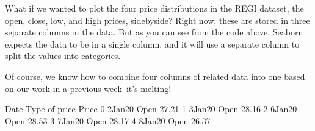 \documentclass[letterpaper,10pt,english]{sphinxmanual}
\begin{document}
\noindent{}

What if we wanted to plot the four price distributions in the REGI dataset, the open, close, low, and high prices, side\sphinxhyphen{}by\sphinxhyphen{}side?  Right now, these are stored in three separate columns in the data.  But as you can see from the code above, Seaborn expects the data to be in a single column, and it will use a separate column to split the values into categories.

Of course, we know how to combine four columns of related data into one based on our work in a previous week–it’s melting!

\begin{sphinxVerbatim}[commandchars=\\\{\}]
   \PYG{p}{[}\PYG{p}{]} \PYG{p}{[}\PYG{p}{]}
                            
\end{sphinxVerbatim}

\begin{sphinxVerbatim}[commandchars=\\\{\}]
       Date Type of price  Price
0  2\PYGZhy{}Jan\PYGZhy{}20          Open  27.21
1  3\PYGZhy{}Jan\PYGZhy{}20          Open  28.16
2  6\PYGZhy{}Jan\PYGZhy{}20          Open  28.53
3  7\PYGZhy{}Jan\PYGZhy{}20          Open  28.17
4  8\PYGZhy{}Jan\PYGZhy{}20          Open  26.37
\end{sphinxVerbatim}

\begin{sphinxVerbatim}[commandchars=\\\{\}]
    
  
\end{sphinxVerbatim}
\end{document}
